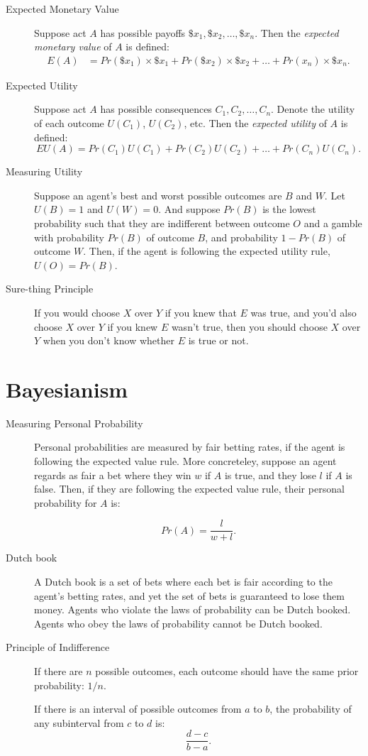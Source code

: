 \documentclass[justified]{tufte-book}
\renewcommand{\u}{U}
\newcommand{\p}{Pr}
\newcommand{\E}{E}
\newcommand{\EU}{EU}
\theoremstyle{definition}
\theoremstyle{definition}
\theoremstyle{definition}
\theoremstyle{definition}
\theoremstyle{remark}
\begin{document}
\begin{description}
\item[Expected Monetary Value]
Suppose act \(A\) has possible payoffs \(\$x_1, \$x_2, \ldots, \$x_n\). Then the \emph{expected monetary value} of \(A\) is defined:
\[
  \begin{aligned}
\E(A) &= \p(\$x_1) \times \$x_1 + \p(\$x_2) \times \$x_2 + \ldots + \p(x_n) \times \$x_n.
  \end{aligned}
\]
\item[Expected Utility]
Suppose act \(A\) has possible consequences \(C_1, C_2, \ldots,C_n\). Denote the utility of each outcome \(U(C_1)\), \(U(C_2)\), etc. Then the \emph{expected utility} of \(A\) is defined:
\[ \EU(A) = \p(C_1)\u(C_1) + \p(C_2)\u(C_2) + \ldots + \p(C_n)\u(C_n). \]
\item[Measuring Utility]
Suppose an agent's best and worst possible outcomes are \(B\) and \(W\). Let \(\u(B) = 1\) and \(\u(W) = 0\). And suppose \(\p(B)\) is the lowest probability such that they are indifferent between outcome \(O\) and a gamble with probability \(\p(B)\) of outcome \(B\), and probability \(1 - \p(B)\) of outcome \(W\). Then, if the agent is following the expected utility rule, \(\u(O) = \p(B)\).
\item[Sure-thing Principle]
If you would choose \(X\) over \(Y\) if you knew that \(E\) was true, and you'd also choose \(X\) over \(Y\) if you knew \(E\) wasn't true, then you should choose \(X\) over \(Y\) when you don't know whether \(E\) is true or not.
\end{description}

\hypertarget{bayesianism-1}{%
\section*{Bayesianism}\label{bayesianism-1}}

\begin{description}
\item[Measuring Personal Probability]
Personal probabilities are measured by fair betting rates, if the agent is following the expected value rule. More concreteley, suppose an agent regards as fair a bet where they win \(w\) if \(A\) is true, and they lose \(l\) if \(A\) is false. Then, if they are following the expected value rule, their personal probability for \(A\) is:

\[ \p(A) = \frac{l}{w + l}. \]
\item[Dutch book]
A Dutch book is a set of bets where each bet is fair according to the agent's betting rates, and yet the set of bets is guaranteed to lose them money. Agents who violate the laws of probability can be Dutch booked. Agents who obey the laws of probability cannot be Dutch booked.
\item[Principle of Indifference]
If there are \(n\) possible outcomes, each outcome should have the same prior probability: \(1/n\).

If there is an interval of possible outcomes from \(a\) to \(b\), the probability of any subinterval from \(c\) to \(d\) is: \[\frac{d-c}{b-a}.\]
\end{description}
\end{document}
